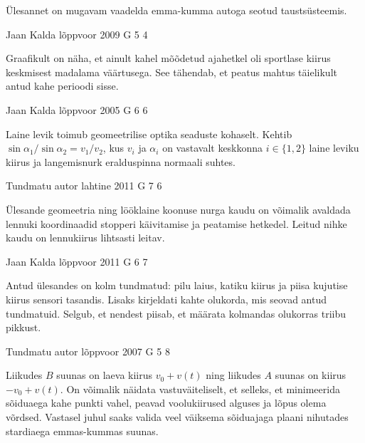 \documentclass[11pt]{article}
\begin{document}
{{\ifHint
Ülesannet on mugavam vaadelda emma-kumma autoga seotud taustsüsteemis.
\fi
}

{Jaan Kalda} %
{lõppvoor} %
{2009} %
{G 5} %
{4} %
{

\ifHint
Graafikult on näha, et ainult kahel mõõdetud ajahetkel oli sportlase kiirus keskmisest madalama väärtusega. See tähendab, et peatus mahtus täielikult antud kahe perioodi sisse.
\fi
}

{Jaan Kalda} %
{lõppvoor} %
{2005} %
{G 6} %
{6} %
{

\ifHint
Laine levik toimub geomeetrilise optika seaduste kohaselt. Kehtib $\sin \alpha_{1}/\sin \alpha_{2}=v_{1}/v_{2}$, kus $v_i$ ja $\alpha_i$ on vastavalt keskkonna $i\in \{1, 2\}$ laine leviku kiirus ja langemisnurk eralduspinna normaali suhtes.
\fi
}

{Tundmatu autor} %
{lahtine} %
{2011} %
{G 7} %
{6} %
{

\ifHint
Ülesande geomeetria ning lööklaine koonuse nurga kaudu on võimalik avaldada lennuki koordinaadid stopperi käivitamise ja peatamise hetkedel. Leitud nihke kaudu on lennukiirus lihtsasti leitav.
\fi
}

{Jaan Kalda} %
{lõppvoor} %
{2011} %
{G 6} %
{7} %
{

\ifHint
Antud ülesandes on kolm tundmatud: pilu laius, katiku kiirus ja piisa kujutise kiirus sensori tasandis. Lisaks kirjeldati kahte olukorda, mis seovad antud tundmatuid. Selgub, et nendest piisab, et määrata kolmandas olukorras triibu pikkust.
\fi
}

{Tundmatu autor} %
{lõppvoor} %
{2007} %
{G 5} %
{8} %
{

\ifHint
Liikudes $B$ suunas on laeva kiirus $v_0 + v(t)$ ning liikudes $A$ suunas on kiirus $-v_0 + v(t)$. On võimalik näidata vastuväiteliselt, et selleks, et minimeerida sõiduaega kahe punkti vahel, peavad voolukiirused alguses ja lõpus olema võrdsed. Vastasel juhul saaks valida veel väiksema sõiduajaga plaani nihutades stardiaega emmas-kummas suunas.
\fi
}

}
\end{document}
